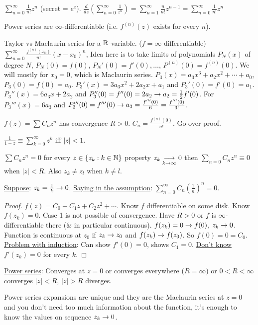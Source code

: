 \documentclass[]{article}
\begin{document}
\begin{example}
	$\sum_{n=0}^\infty \frac{1}{n!} z^n$ (secret = $e^z$). $\frac{d}{dz} \left(\sum_{n=0}^\infty \frac{1}{z^n} \right) = \sum_{n=1}^\infty \frac{n}{n!} z^{n-1} = \sum_{n=0}^\infty \frac{1}{n!} z^n$
\end{example}
\begin{corollary}
	Power series are $\infty$-differentiable (i.e. $f^{(n)}(z)$ exists for every $n$).
\end{corollary}

Taylor vs Maclaurin series for a $\mathbb{R}$-variable. ($f= \infty$-differentiable) $\sum_{n=0}^{\infty} \frac{f^{(n)}(x_0)}{n!}(x-x_0)^n$, Idea here is to take limits of polynomials $P_N(x)$ of degree $N$,  $P_N(0) = f(0)$, $P_N'(0) = f'(0), \dots$, $P^{(n)}(0) = f^{(n)}(0)$. We will mostly for $x_0=0$, which is Maclaurin series. $P_3(x) = a_3 x^3 + a_2x^2 + \cdots + a_0$, $P_3(0) = f(0) = a_0$. $P_3'(x) = 3a_3x^2 + 2a_2x + a_1$ and $P_3'(0) = f'(0)=a_1$. $P_3''(x) = 6a_3 x + 2a_2$ and $P_3''(0) = f''(0) = 2a_2 \rightarrow a_2 = \frac{1}{2}f'(0)$. For $P_3'''(x) = 6a_3$ and $P_3'''(0) = f'''(0) \rightarrow a_3 = \frac{f'''(0)}{6} = \frac{f'''(0)}{3!}$.
\begin{corollary}
	$f(z) = \sum C_n z^n$ has convergence $R>0$. $C_n = \frac{f^{(n)}(0)}{n!}$. Go over proof.
\end{corollary}
\begin{example}
	$\frac{1}{1-z} \equiv \sum_{k=0}^\infty z^k$ iff $|z|<1$.
\end{example}
\begin{theorem}
	[Uniqueness] $\sum C_n z^n = 0$ for every $z\in\{z_k:k\in\mathbb{N}\}$ property $z_k\underset{k\rightarrow\infty}{\longrightarrow} 0$ then $\sum_{n=0} C_nz^n \equiv 0$ when $|z|<R$. Also $z_k\neq z_l$ when $k\neq l$.
\end{theorem}
\begin{example}
	\underline{Suppose}: $z_k = \frac{1}{k} \rightarrow 0$. \underline{Saying in the assumption}: $\sum_{n=0}^\infty C_n \left(\frac{1}{n}\right)^n = 0$.
\end{example}
\begin{proof}
	$f(z) = C_0 + C_1 z + C_2 z^2 + \cdots $. Know $f$ differentiable on some disk. Know $f(z_k) =0$. Case 1 is not possible of convergence. Have $R>0$ or $f$ is $\infty$-differentiable there (\& in particular continuous). $f(z_k) = 0 \rightarrow f(0)$, $z_k\rightarrow 0$. Function is continuous at $z_0$ if $z_k \rightarrow z_0$ and $f(z_k)\rightarrow f(z_0)$. So $f(0) = 0 = C_0$. \underline{Problem with induction}:  Can show $f'(0)=0$, shows $C_1=0$. \underline{Don't know} $f'(z_k)=0$ for every $k$.
\end{proof}
\underline{Power series}: Converges at $z=0$ or converges everywhere ($R=\infty$) or $0<R<\infty$ converges $|z|<R$, $|z|>R$ diverges.
\begin{corollary}
	Power series expansions are unique and they are the Maclaurin series at $z=0$ and you don't need too much information about the function, it's enough to know the values on sequence $z_k\rightarrow0$.
\end{corollary}
\end{document}
